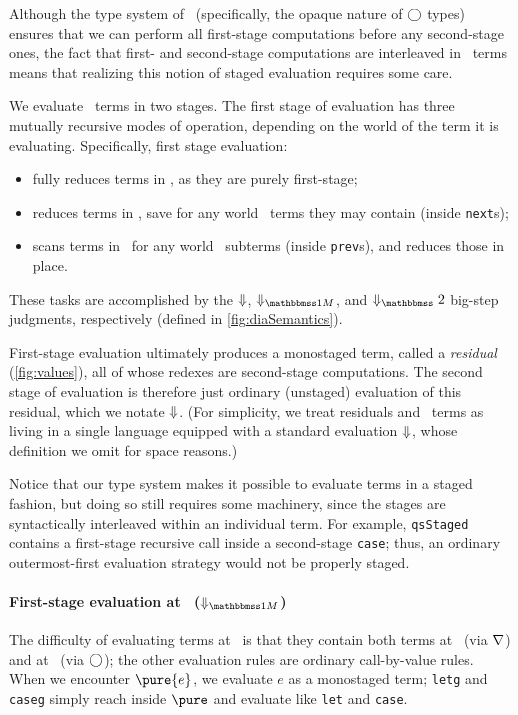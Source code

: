 \begin{abstrsyn}

Although the type system of \lang\ (specifically, the opaque nature of $\bigcirc$
types) ensures that we can perform all first-stage computations before any
second-stage ones, the fact that first- and second-stage computations are
interleaved in \lang\ terms means that realizing this notion of staged
evaluation requires some care.

We evaluate \lang\ terms in two stages. The first stage of evaluation has three
mutually recursive modes of operation, depending on the world of the term it is
evaluating. Specifically, first stage evaluation:
\begin{itemize}
\item fully reduces terms in \bbonep, as they are purely first-stage;
\item reduces terms in \bbonem, save for any world \bbtwo\ terms they may
contain (inside \texttt{next}s);
\item scans terms in \bbtwo\ for any world \bbonem\ subterms (inside \texttt{prev}s), 
and reduces those in place.
\end{itemize}
These tasks are accomplished by the ${\Downarrow}$, $\redonesym$, and $\redtwosym$
big-step judgments, respectively (defined in \ref{fig:diaSemantics}).

First-stage evaluation ultimately produces a monostaged term, called a \emph{residual}
(\ref{fig:values}), all of whose redexes are second-stage computations. The
second stage of evaluation is therefore just ordinary (unstaged) evaluation of
this residual, which we notate ${\Downarrow}$. (For simplicity, we treat residuals
and \bbonep\ terms as living in a single language equipped with a standard
evaluation ${\Downarrow}$, whose definition we omit for space reasons.)

Notice that our type system makes it possible to evaluate terms in a staged
fashion, but doing so still requires some machinery, since the stages are
syntactically interleaved within an individual term. For example,
\texttt{qsStaged} contains a first-stage recursive call inside a second-stage
\texttt{case}; thus, an ordinary outermost-first evaluation strategy would not
be properly staged.

\paragraph{First-stage evaluation at \bbonem\ ($\redonesym$)}
The difficulty of evaluating terms at \bbonem\ is that they contain both terms
at \bbonep\ (via $\nabla$) and at \bbtwo\ (via $\bigcirc$); the other evaluation
rules are ordinary call-by-value rules. When we encounter $\pure{e}$, we
evaluate $e$ as a monostaged term; \texttt{letg} and \texttt{caseg} simply reach
inside $\pure$ and evaluate like \texttt{let} and \texttt{case}.


\end{abstrsyn}
